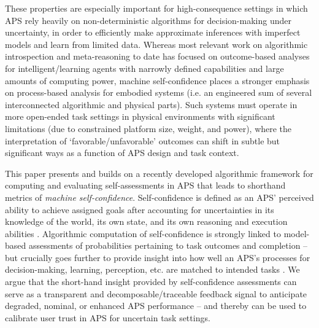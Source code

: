 These properties are especially important for high-consequence settings in which APS rely heavily on non-deterministic algorithms for decision-making under uncertainty, in order to efficiently make approximate inferences with imperfect models and learn from limited data. 
Whereas most relevant work on algorithmic introspection and meta-reasoning to date has focused on outcome-based analyses for intelligent/learning agents with narrowly defined capabilities and large amounts of computing power, machine self-confidence places a stronger emphasis on process-based analysis for embodied systems (i.e. an engineered sum of several interconnected algorithmic and physical parts). Such systems must operate in more open-ended task settings in physical environments with significant limitations (due to constrained platform size, weight, and power), where the interpretation of `favorable/unfavorable' outcomes can shift in subtle but significant ways as a function of APS design and task context. 

This paper presents and builds on a recently developed algorithmic framework for computing and evaluating self-assessments in APS that leads to shorthand metrics of \emph{machine self-confidence}. Self-confidence is defined as an APS' perceived ability to achieve assigned goals after accounting for uncertainties in its knowledge of the world, its own state, and its own reasoning and execution abilities \cite{Aitken2016-cv, Aitken2016-fb, Sweet2016-tz}. 
Algorithmic computation of self-confidence is strongly linked to model-based assessments of probabilities pertaining to task outcomes and completion -- but crucially goes further to provide insight into how well an APS's processes for decision-making, learning, perception, etc. are matched to intended tasks \cite{Hutchins2015-if}. 
We argue that the short-hand insight provided by self-confidence assessments can serve as a transparent and decomposable/traceable feedback signal to anticipate degraded, nominal, or enhanced APS performance -- %
and thereby can be used to calibrate user trust in APS for uncertain task settings. 

